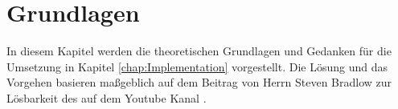 \chapter{Grundlagen}
In diesem Kapitel werden die theoretischen Grundlagen und Gedanken für die Umsetzung in Kapitel \ref{chap:Implementation} vorgestellt. Die Lösung und das Vorgehen basieren maßgeblich auf dem Beitrag  von Herrn Steven Bradlow zur Lösbarkeit des  auf dem Youtube Kanal  \autocite{Unsolvable-14-15-Numberphile-YT:online}.%
%


%
%
%
%
%
%
%
%

